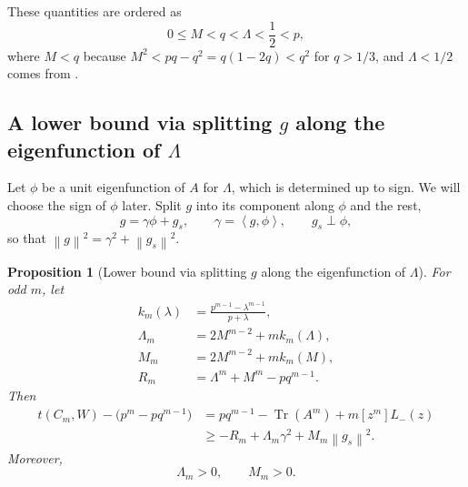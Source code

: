 \documentclass[11pt]{article}
\newtheorem{proposition}[theorem]{Proposition}
\numberwithin{equation}{section}
\newcommand{\ip}[2]{\left\langle #1,#2\right\rangle}
\newcommand{\norm}[1]{\left\lVert #1\right\rVert}
\newcommand{\Tr}{\operatorname{Tr}}
\begin{document}
These quantities are ordered as
\begin{equation}\label{eq:plt23-M-Lambda-order}
  0\le M<q<\Lambda<\frac{1}{2}<p,
\end{equation}
where $M<q$ because $M^2<pq-q^2=q(1-2q)<q^2$ for $q>1/3$, and $\Lambda<1/2$ comes from .

\subsection{A lower bound via splitting \texorpdfstring{$g$}{g} along the
eigenfunction of \texorpdfstring{$\Lambda$}{Lambda}}\label{subsec:plt23-splitting-lower-bound}

Let $\phi$ be a unit eigenfunction of $A$ for $\Lambda$, which is determined up to sign.
We will choose the sign of $\phi$ later.
Split $g$ into its component along $\phi$ and the rest,
\begin{equation}\label{eq:plt23-g-decomp}
  g=\gamma\phi+g_s,
  \qquad \gamma=\ip g\phi,
  \qquad g_s\perp\phi,
\end{equation}
so that $\norm g^2=\gamma^2+\norm{g_s}^2$.

\begin{proposition}[Lower bound via splitting $g$ along the eigenfunction of $\Lambda$]\label{prop:plt23-splitting-lower-bound}
  For odd $m$, let
  \begin{align}
    k_m(\lambda)&=\frac{p^{m-1}-\lambda^{m-1}}{p+\lambda},
    \label{eq:plt23-km-def}\\
    \Lambda_m&=2M^{m-2}+mk_m(\Lambda),\label{eq:plt23-Lambdam-def}\\
    M_m&=2M^{m-2}+mk_m(M),\label{eq:plt23-Mm-def}\\
    R_m&=\Lambda^m+M^m-pq^{m-1}.\label{eq:plt23-Rm-def}
  \end{align}
  Then
  \begin{align}
    t(C_m,W)-\bigl(p^m-pq^{m-1}\bigr)
    &= pq^{m-1} - \Tr(A^m)+m[z^m]L_-(z) \nonumber
    \\
    {} &\ge -R_m+\Lambda_m\gamma^2+M_m\norm{g_s}^2.\label{eq:plt23-splitting-lower-bound}
  \end{align}
  Moreover,
  \begin{equation}\label{eq:plt23-Lambdam-Mm-positive}
    \Lambda_m>0,
    \qquad
    M_m>0.
  \end{equation}
\end{proposition}
\end{document}
